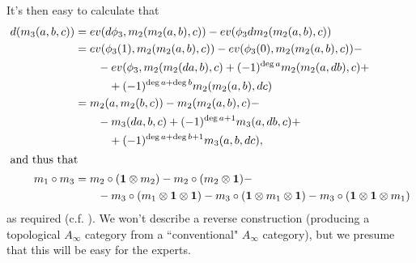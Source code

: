 {It's then easy to calculate that
\begin{align*}
d(m_3(a,b,c)) & = ev(d \phi_3, m_2(m_2(a,b),c)) - ev(\phi_3 d m_2(m_2(a,b), c)) \\
 & = ev( \phi_3(1), m_2(m_2(a,b),c)) - ev(\phi_3(0), m_2 (m_2(a,b),c)) - \\ & \qquad - ev(\phi_3, m_2(m_2(da, b), c) + (-1)^{\deg a} m_2(m_2(a, db), c) + \\ & \qquad \quad + (-1)^{\deg a+\deg b} m_2(m_2(a, b), dc) \\
 & = m_2(a , m_2(b,c)) - m_2(m_2(a,b),c) - \\ & \qquad - m_3(da,b,c) + (-1)^{\deg a + 1} m_3(a,db,c) + \\ & \qquad \quad + (-1)^{\deg a + \deg b + 1} m_3(a,b,dc), \\
\intertext{and thus that}
m_1 \circ m_3 & =  m_2 \circ (\boldsymbol{1} \otimes m_2) - m_2 \circ (m_2 \otimes \boldsymbol{1}) - \\ & \qquad - m_3 \circ (m_1 \otimes \boldsymbol{1} \otimes \boldsymbol{1}) - m_3 \circ (\boldsymbol{1} \otimes m_1 \otimes \boldsymbol{1}) - m_3 \circ (\boldsymbol{1} \otimes \boldsymbol{1} \otimes m_1)
\end{align*}
as required (c.f. \cite[p. 6]{MR1854636}).
We won't describe a reverse construction (producing a topological $A_\infty$ category 
from a ``conventional" $A_\infty$ category), but we presume that this will be easy for the experts.

} %